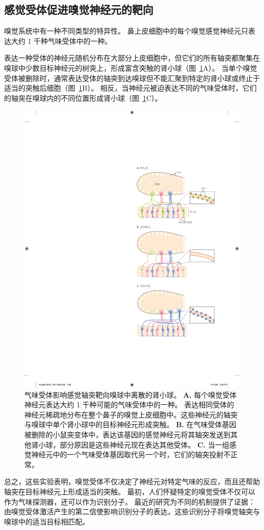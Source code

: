 \subsection{感觉受体促进嗅觉神经元的靶向}

嗅觉系统中有一种不同类型的特异性。
鼻上皮细胞中的每个嗅觉感觉神经元只表达大约 1 千种气味受体中的一种。


表达一种受体的神经元随机分布在大部分上皮细胞中，但它们的所有轴突都聚集在嗅球中少数目标神经元的树突上，形成富含突触的肾小球（图~\ref{fig:48_3}A）。
当单个嗅觉受体被删除时，通常表达受体的轴突到达嗅球但不能汇聚到特定的肾小球或终止于适当的突触后细胞（图~\ref{fig:48_3}B）。
相反，当神经元被迫表达不同的气味受体时，它们的轴突在嗅球内的不同位置形成肾小球（图~\ref{fig:48_3}C）。


\begin{figure}[htbp]
	\centering
	\includegraphics[width=0.5\linewidth]{chap48/fig_48_3}
	\caption{气味受体影响感觉轴突靶向嗅球中离散的肾小球\cite{sanes2009many}。
		\textbf{A.} 每个嗅觉受体神经元表达大约 1 千种可能的气味受体中的一种。
		表达相同受体的神经元稀疏地分布在整个鼻子的嗅觉上皮细胞中。这些神经元的轴突与嗅球中单个肾小球中的目标神经元形成突触。
		\textbf{B.} 在气味受体基因被删除的小鼠突变体中，表达该基因的感觉神经元将其轴突发送到其他肾小球，部分原因是这些神经元现在表达其他受体。
		\textbf{C.} 当一组感觉神经元中的一个气味受体基因取代另一个时，它们的轴突投射不正常。}
	\label{fig:48_3}
\end{figure}


总之，这些实验表明，嗅觉受体不仅决定了神经元对特定气味的反应，而且还帮助轴突在目标神经元上形成适当的突触。
最初，人们怀疑特定的嗅觉受体不仅可以作为气味探测器，还可以作为识别分子。
最近的研究为不同的机制提供了证据：
由嗅觉受体激活产生的第二信使影响识别分子的表达，这些识别分子将嗅觉轴突与嗅球中的适当目标相匹配。


